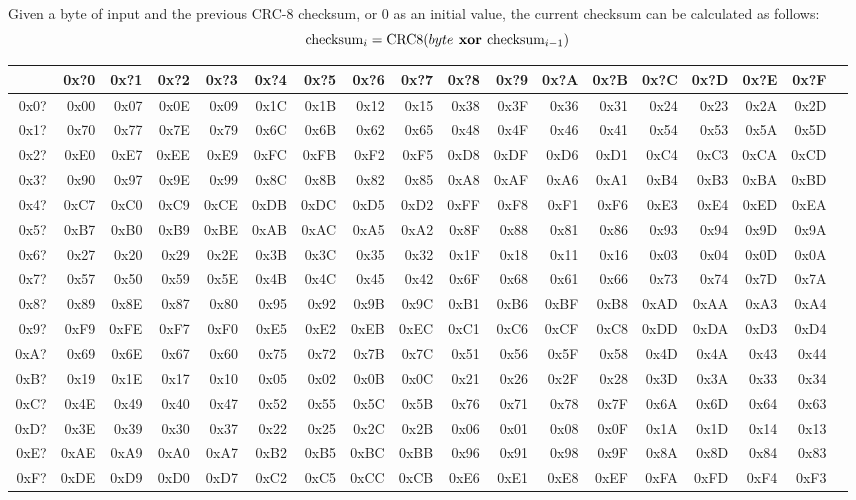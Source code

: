 Given a byte of input and the previous CRC-8 checksum,
or 0 as an initial value, the current checksum can be calculated as follows:
\begin{equation}
\text{checksum}_i = \text{CRC8}(byte\textbf{ xor }\text{checksum}_{i - 1})
\end{equation}
\begin{table}[h]
{\ttfamily
\begin{tabular}{|r||r|r|r|r|r|r|r|r|r|r|r|r|r|r|r|r|r|}
\hline
 & 0x?0 & 0x?1 & 0x?2 & 0x?3 & 0x?4 & 0x?5 & 0x?6 & 0x?7 & 0x?8 & 0x?9 & 0x?A & 0x?B & 0x?C & 0x?D & 0x?E & 0x?F \\
\hline
0x0? & 0x00 & 0x07 & 0x0E & 0x09 & 0x1C & 0x1B & 0x12 & 0x15 & 0x38 & 0x3F & 0x36 & 0x31 & 0x24 & 0x23 & 0x2A & 0x2D \\
0x1? & 0x70 & 0x77 & 0x7E & 0x79 & 0x6C & 0x6B & 0x62 & 0x65 & 0x48 & 0x4F & 0x46 & 0x41 & 0x54 & 0x53 & 0x5A & 0x5D \\
0x2? & 0xE0 & 0xE7 & 0xEE & 0xE9 & 0xFC & 0xFB & 0xF2 & 0xF5 & 0xD8 & 0xDF & 0xD6 & 0xD1 & 0xC4 & 0xC3 & 0xCA & 0xCD \\
0x3? & 0x90 & 0x97 & 0x9E & 0x99 & 0x8C & 0x8B & 0x82 & 0x85 & 0xA8 & 0xAF & 0xA6 & 0xA1 & 0xB4 & 0xB3 & 0xBA & 0xBD \\
0x4? & 0xC7 & 0xC0 & 0xC9 & 0xCE & 0xDB & 0xDC & 0xD5 & 0xD2 & 0xFF & 0xF8 & 0xF1 & 0xF6 & 0xE3 & 0xE4 & 0xED & 0xEA \\
0x5? & 0xB7 & 0xB0 & 0xB9 & 0xBE & 0xAB & 0xAC & 0xA5 & 0xA2 & 0x8F & 0x88 & 0x81 & 0x86 & 0x93 & 0x94 & 0x9D & 0x9A \\
0x6? & 0x27 & 0x20 & 0x29 & 0x2E & 0x3B & 0x3C & 0x35 & 0x32 & 0x1F & 0x18 & 0x11 & 0x16 & 0x03 & 0x04 & 0x0D & 0x0A \\
0x7? & 0x57 & 0x50 & 0x59 & 0x5E & 0x4B & 0x4C & 0x45 & 0x42 & 0x6F & 0x68 & 0x61 & 0x66 & 0x73 & 0x74 & 0x7D & 0x7A \\
0x8? & 0x89 & 0x8E & 0x87 & 0x80 & 0x95 & 0x92 & 0x9B & 0x9C & 0xB1 & 0xB6 & 0xBF & 0xB8 & 0xAD & 0xAA & 0xA3 & 0xA4 \\
0x9? & 0xF9 & 0xFE & 0xF7 & 0xF0 & 0xE5 & 0xE2 & 0xEB & 0xEC & 0xC1 & 0xC6 & 0xCF & 0xC8 & 0xDD & 0xDA & 0xD3 & 0xD4 \\
0xA? & 0x69 & 0x6E & 0x67 & 0x60 & 0x75 & 0x72 & 0x7B & 0x7C & 0x51 & 0x56 & 0x5F & 0x58 & 0x4D & 0x4A & 0x43 & 0x44 \\
0xB? & 0x19 & 0x1E & 0x17 & 0x10 & 0x05 & 0x02 & 0x0B & 0x0C & 0x21 & 0x26 & 0x2F & 0x28 & 0x3D & 0x3A & 0x33 & 0x34 \\
0xC? & 0x4E & 0x49 & 0x40 & 0x47 & 0x52 & 0x55 & 0x5C & 0x5B & 0x76 & 0x71 & 0x78 & 0x7F & 0x6A & 0x6D & 0x64 & 0x63 \\
0xD? & 0x3E & 0x39 & 0x30 & 0x37 & 0x22 & 0x25 & 0x2C & 0x2B & 0x06 & 0x01 & 0x08 & 0x0F & 0x1A & 0x1D & 0x14 & 0x13 \\
0xE? & 0xAE & 0xA9 & 0xA0 & 0xA7 & 0xB2 & 0xB5 & 0xBC & 0xBB & 0x96 & 0x91 & 0x98 & 0x9F & 0x8A & 0x8D & 0x84 & 0x83 \\
0xF? & 0xDE & 0xD9 & 0xD0 & 0xD7 & 0xC2 & 0xC5 & 0xCC & 0xCB & 0xE6 & 0xE1 & 0xE8 & 0xEF & 0xFA & 0xFD & 0xF4 & 0xF3 \\
\hline
\end{tabular}
}
\end{table}
